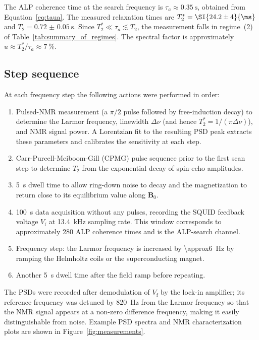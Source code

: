 The ALP coherence time at the search frequency is $\tau_a \approx \SI{0.35}{\s}$, obtained from Equation~\eqref{eq:taua}. The measured relaxation times are $T_2^* = \SI{24.2\pm4}{\ms}$ and $T_2 = \SI{0.72(5)}{\s}$. Since $T_2^* \ll \tau_a \lesssim T_2$, the measurement falls in regime~(2) of Table~\ref{tab:summary_of_regimes}. The spectral factor is approximately $u \approx T_2^*/\tau_a \approx \SI{7}{\%}$.

\subsection{Step sequence}

At each frequency step the following actions were performed in order:
\begin{enumerate}[label=\arabic*.]
    \item Pulsed-NMR measurement (a $\pi/2$ pulse followed by free-induction decay) to determine the Larmor frequency, linewidth $\Delta\nu$ (and hence $T_2^* = 1/(\pi\Delta\nu)$), and NMR signal power. A Lorentzian fit to the resulting PSD peak extracts these parameters and calibrates the sensitivity at each step.
    \item Carr-Purcell-Meiboom-Gill (CPMG) \cite{CPMG} pulse sequence prior to the first scan step to determine $T_2$ from the exponential decay of spin-echo amplitudes.
    \item \SI{5}{\s} dwell time to allow ring-down noise to decay and the magnetization to return close to its equilibrium value along $\mathbf{B}_0$.
    \item \SI{100}{\s} data acquisition without any pulses, recording the SQUID feedback voltage $V_\mathrm{f}$ at \SI{13.4}{\kHz} sampling rate. This window corresponds to approximately 280 ALP coherence times and is the ALP-search channel.
    \item Frequency step: the Larmor frequency is increased by \SI{\approx6}{\Hz} by ramping the Helmholtz coils or the superconducting magnet.
    \item Another \SI{5}{\s} dwell time after the field ramp before repeating.
\end{enumerate}
The PSDs were recorded after demodulation of $V_\mathrm{f}$ by the lock-in amplifier; its reference frequency was detuned by \SI{820}{\Hz} from the Larmor frequency so that the NMR signal appears at a non-zero difference frequency, making it easily distinguishable from noise. Example PSD spectra and NMR characterization plots are shown in Figure~\ref{fig:measurements}.

